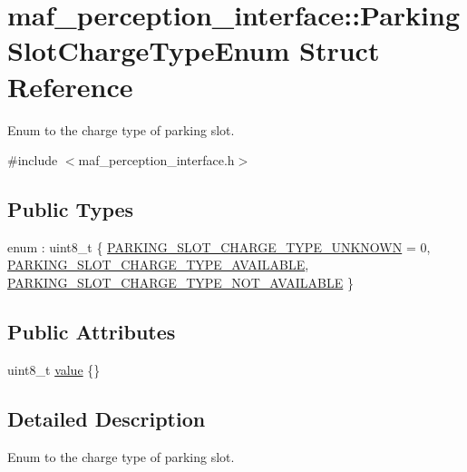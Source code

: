 \hypertarget{structmaf__perception__interface_1_1ParkingSlotChargeTypeEnum}{}\section{maf\+\_\+perception\+\_\+interface\+:\+:Parking\+Slot\+Charge\+Type\+Enum Struct Reference}
\label{structmaf__perception__interface_1_1ParkingSlotChargeTypeEnum}


Enum to the charge type of parking slot.  




{\ttfamily \#include $<$maf\+\_\+perception\+\_\+interface.\+h$>$}

\subsection*{Public Types}
\begin{DoxyCompactItemize}
\item 
enum \+: uint8\+\_\+t \{ \hyperlink{structmaf__perception__interface_1_1ParkingSlotChargeTypeEnum_a414fc726d83a7fd18ae191ad29b635dfa27f3262918ea71546d8826c97e549fd6}{P\+A\+R\+K\+I\+N\+G\+\_\+\+S\+L\+O\+T\+\_\+\+C\+H\+A\+R\+G\+E\+\_\+\+T\+Y\+P\+E\+\_\+\+U\+N\+K\+N\+O\+WN} = 0, 
\hyperlink{structmaf__perception__interface_1_1ParkingSlotChargeTypeEnum_a414fc726d83a7fd18ae191ad29b635dfa8545d75b3df1ae68f4b46e96908b4857}{P\+A\+R\+K\+I\+N\+G\+\_\+\+S\+L\+O\+T\+\_\+\+C\+H\+A\+R\+G\+E\+\_\+\+T\+Y\+P\+E\+\_\+\+A\+V\+A\+I\+L\+A\+B\+LE}, 
\hyperlink{structmaf__perception__interface_1_1ParkingSlotChargeTypeEnum_a414fc726d83a7fd18ae191ad29b635dfa9f58d81048b0455052be895b0158277a}{P\+A\+R\+K\+I\+N\+G\+\_\+\+S\+L\+O\+T\+\_\+\+C\+H\+A\+R\+G\+E\+\_\+\+T\+Y\+P\+E\+\_\+\+N\+O\+T\+\_\+\+A\+V\+A\+I\+L\+A\+B\+LE}
 \}
\end{DoxyCompactItemize}
\subsection*{Public Attributes}
\begin{DoxyCompactItemize}
\item 
uint8\+\_\+t \hyperlink{structmaf__perception__interface_1_1ParkingSlotChargeTypeEnum_adea663d9c83268686960c19f96209fec}{value} \{\}
\end{DoxyCompactItemize}


\subsection{Detailed Description}
Enum to the charge type of parking slot. 

